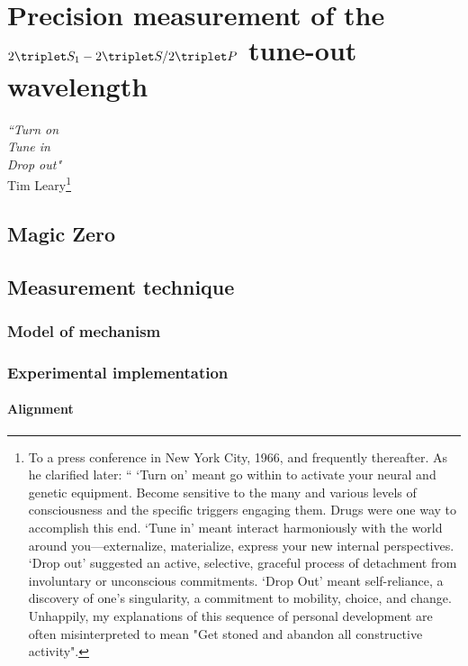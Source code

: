 
\chapter{Precision measurement of the $2\triplet S_1 - 2 \triplet S/2\triplet P$ tune-out wavelength}
\label{chap:tuneout}

\begin{adjustwidth}{3cm}{0cm}
\begin{flushright}
{\emph{``Turn on\\
		Tune in\\
		Drop out"\\} 
Tim Leary\footnote{To a press conference in New York City, 1966, and frequently thereafter.
	As he clarified later: `` `Turn on' meant go within to activate your neural and genetic equipment.
	Become sensitive to the many and various levels of consciousness and the specific triggers engaging them.
	Drugs were one way to accomplish this end.
	`Tune in' meant interact harmoniously with the world around you—externalize, materialize, express your new internal perspectives.
	`Drop out' suggested an active, selective, graceful process of detachment from involuntary or unconscious commitments.
	`Drop Out' meant self-reliance, a discovery of one's singularity, a commitment to mobility, choice, and change.
	Unhappily, my explanations of this sequence of personal development are often misinterpreted to mean "Get stoned and abandon all constructive activity".}}
\end{flushright}
\end{adjustwidth}

\section{Magic Zero}\label{sec:to-history}
\section{Measurement technique}\label{sec:to-method}
\subsection{Model of mechanism}\label{ssec:to-model}
\subsection{Experimental implementation}\label{ssec:to-expt}
\subsubsection*{Alignment}
